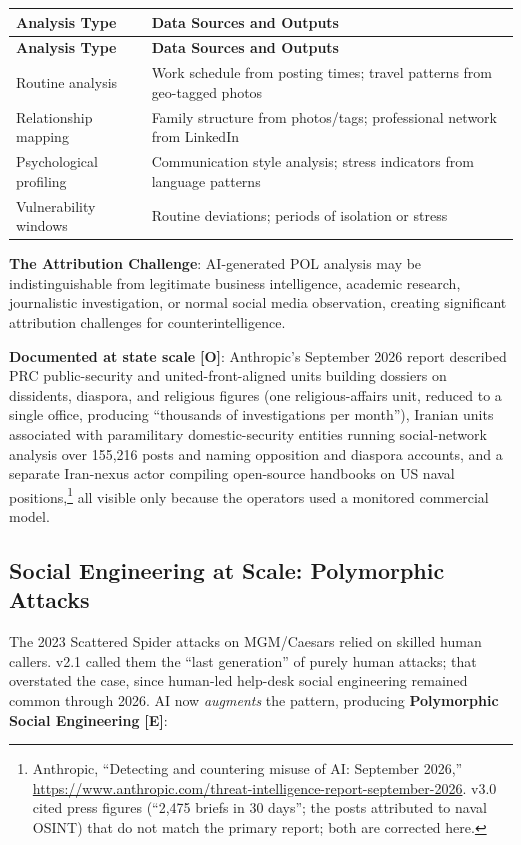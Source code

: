 \documentclass[11pt,letterpaper]{article}
\newcommand{\etraneed}[1]{\par\ifdim\pagegoal<\maxdimen\ifdim\pagetotal<\pagegoal\ifdim\dimexpr\pagegoal-\pagetotal\relax<\dimexpr#1\relax\newpage\fi\fi\fi}
\begin{document}
\etraneed{10\baselineskip}
{\small
\begin{longtable}{L{3.5cm}L{8cm}}
\toprule
\textbf{Analysis Type} & \textbf{Data Sources and Outputs} \\
\midrule
\endfirsthead
\toprule
\textbf{Analysis Type} & \textbf{Data Sources and Outputs} \\
\midrule
\endhead
Routine analysis & Work schedule from posting times; travel patterns from geo-tagged photos \\*
Relationship mapping & Family structure from photos/tags; professional network from LinkedIn \\
Psychological profiling & Communication style analysis; stress indicators from language patterns \\*
Vulnerability windows & Routine deviations; periods of isolation or stress \\
\bottomrule
\end{longtable}}

\textbf{The Attribution Challenge}: AI-generated POL analysis may be indistinguishable from legitimate business intelligence, academic research, journalistic investigation, or normal social media observation, creating significant attribution challenges for counterintelligence.

\textbf{Documented at state scale} \textbf{[O]}: Anthropic's September 2026 report described PRC public-security and united-front-aligned units building dossiers on dissidents, diaspora, and religious figures (one religious-affairs unit, reduced to a single office, producing ``thousands of investigations per month''), Iranian units associated with paramilitary domestic-security entities running social-network analysis over 155,216 posts and naming opposition and diaspora accounts, and a separate Iran-nexus actor compiling open-source handbooks on US naval positions,\footnote{Anthropic, ``Detecting and countering misuse of AI: September 2026,'' \url{https://www.anthropic.com/threat-intelligence-report-september-2026}. v3.0 cited press figures (``2,475 briefs in 30 days''; the posts attributed to naval OSINT) that do not match the primary report; both are corrected here.} all visible only because the operators used a monitored commercial model.

\subsection{Social Engineering at Scale: Polymorphic Attacks}

The 2023 Scattered Spider attacks on MGM/Caesars relied on skilled human callers. v2.1 called them the ``last generation'' of purely human attacks; that overstated the case, since human-led help-desk social engineering remained common through 2026. AI now \textit{augments} the pattern, producing \textbf{Polymorphic Social Engineering} \textbf{[E]}:
\end{document}
